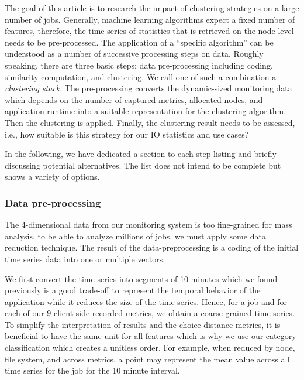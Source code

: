 \documentclass[]{llncs}
\begin{document}
The goal of this article is to research the impact of clustering strategies on a large number of jobs. Generally, machine learning algorithms expect a fixed number of features, therefore, the time series of statistics that is retrieved on the node-level needs to be pre-processed.
The application of a “specific algorithm” can be understood as a number of successive processing steps on data. Roughly speaking, there are three basic steps: data pre-processing including coding, similarity computation, and clustering.
We call one of such a combination a \textit{clustering stack}.
The pre-processing converts the dynamic-sized monitoring data which depends on the number of captured metrics, allocated nodes, and application runtime into a suitable representation for the clustering algorithm.
Then the clustering is applied. Finally, the clustering result needs to be assessed, i.e., how suitable is this strategy for our IO statistics and use cases?

In the following, we have dedicated a section to each step listing and briefly discussing potential alternatives.
The list does not intend to be complete but shows a variety of options.

\subsubsection{Data pre-processing}
The 4-dimensional data from our monitoring system is too fine-grained for mass analysis,
to be able to analyze millions of jobs, we must apply some data reduction technique.
The result of the data-preprocessing is a coding of the initial time series data into one or multiple vectors.

We first convert the time series into segments of 10 minutes which we found previously is a good trade-off to represent the temporal behavior of the application while it reduces the size of the time series.
Hence, for a job and for each of our 9 client-side recorded metrics, we obtain a coarse-grained time series.
To simplify the interpretation of results and the choice distance metrics, it is beneficial to have the same unit for all features which is why we use our category classification which creates a unitless order.
For example, when reduced by node, file system, and across metrics, a point may represent the mean value across all time series for the job for the 10 minute interval.
\end{document}
